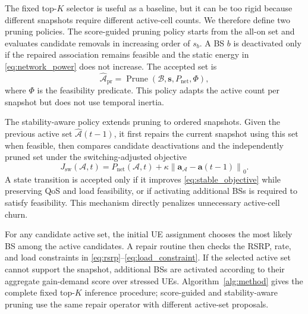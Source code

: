 \documentclass[journal]{IEEEtran}
\begin{document}
The fixed top-$K$ selector is useful as a baseline, but it can be too rigid
because different snapshots require different active-cell counts. We therefore
define two pruning policies. The score-guided pruning policy starts from the
all-on set and evaluates candidate removals in increasing order of $s_b$. A BS
$b$ is deactivated only if the repaired association remains feasible and the
static energy in \eqref{eq:network_power} does not increase. The accepted set
is
\begin{equation}
    \widehat{\mathcal{A}}_{\mathrm{pr}}
    =
    \operatorname{Prune}\left(\mathcal{B},\mathbf{s},
    P_{\mathrm{net}},\Phi\right),
    \label{eq:pruned_set}
\end{equation}
where $\Phi$ is the feasibility predicate. This policy adapts the active count
per snapshot but does not use temporal inertia.

The stability-aware policy extends pruning to ordered snapshots. Given the
previous active set $\widehat{\mathcal{A}}(t-1)$, it first repairs the current
snapshot using this set when feasible, then compares candidate deactivations
and the independently pruned set under the switching-adjusted objective
\begin{equation}
    J_{\mathrm{sw}}(\mathcal{A},t)
    =
    P_{\mathrm{net}}(\mathcal{A},t)
    +
    \kappa
    \left\|\mathbf{a}_{\mathcal{A}}-\mathbf{a}(t-1)\right\|_0.
    \label{eq:stable_objective}
\end{equation}
A state transition is accepted only if it improves
\eqref{eq:stable_objective} while preserving QoS and load feasibility, or if
activating additional BSs is required to satisfy feasibility. This mechanism
directly penalizes unnecessary active-cell churn.

For any candidate active set, the initial UE assignment chooses the most likely
BS among the active candidates. A repair routine then checks the RSRP, rate,
and load constraints in \eqref{eq:rsrp}--\eqref{eq:load_constraint}. If the
selected active set cannot support the snapshot, additional BSs are activated
according to their aggregate gain-demand score over stressed UEs.
Algorithm~\ref{alg:method} gives the complete fixed top-$K$ inference
procedure; score-guided and stability-aware pruning use the same repair
operator with different active-set proposals.
\end{document}

